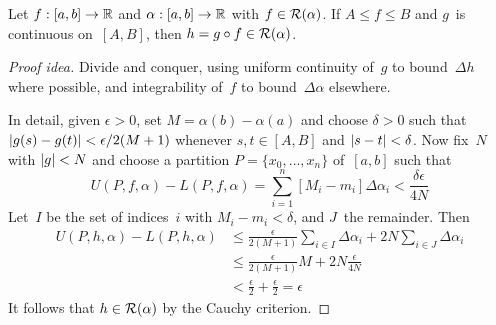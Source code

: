\begin{thm}
Let \(f:[a,b]\to\mathbb{R}\) and \(\alpha:[a,b]\to\mathbb{R}\) with \(f\in\mathcal{R}(\alpha)\). If \(A\le f\le B\) and \(g\)~is continuous on~\([A,B]\), then \(h=g\circ f\in\mathcal{R}(\alpha)\).
\end{thm}
\begin{proof}[Proof idea]
Divide and conquer, using uniform continuity of~\(g\) to bound~\(\Delta h\) where possible, and integrability of~\(f\) to bound~\(\Delta\alpha\) elsewhere.

In detail, given \(\epsilon>0\), set \(M=\alpha(b)-\alpha(a)\) and choose \(\delta>0\) such that \(|{g(s)-g(t)}|<\epsilon/2(M+1)\) whenever \(s,t\in[A,B]\) and \(|{s-t}|<\delta\). Now fix~\(N\) with \(|{g}|<N\) and choose a partition \(P=\{x_0,\ldots,x_n\}\) of~\([a,b]\) such that
\[U(P,f,\alpha)-L(P,f,\alpha)=\sum_{i=1}^n[M_i-m_i]\Delta\alpha_i<\frac{\delta\epsilon}{4N}\]
Let~\(I\) be the set of indices~\(i\) with \(M_i-m_i<\delta\), and \(J\)~the remainder. Then
\begin{align*}
U(P,h,\alpha)-L(P,h,\alpha)&\le\frac{\epsilon}{2(M+1)}\sum_{i\in I}\Delta\alpha_i+2N\sum_{i\in J}\Delta\alpha_i\\
	&\le\frac{\epsilon}{2(M+1)}M+2N\frac{\epsilon}{4N}\\
	&<\frac{\epsilon}{2}+\frac{\epsilon}{2}=\epsilon
\end{align*}
It follows that \(h\in\mathcal{R}(\alpha)\) by the Cauchy criterion.
\end{proof}

